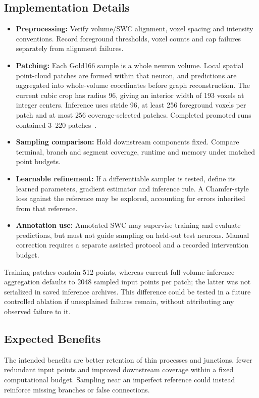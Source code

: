 \documentclass[11pt,a4paper]{article}
\begin{document}
\subsection{Implementation Details}
\begin{itemize}
    \item \textbf{Preprocessing:} Verify volume/SWC alignment, voxel spacing and intensity conventions. Record foreground thresholds, voxel counts and cap failures separately from alignment failures.
    \item \textbf{Patching:} Each Gold166 sample is a whole neuron volume. Local spatial point-cloud patches are formed within that neuron, and predictions are aggregated into whole-volume coordinates before graph reconstruction. The current cubic crop has radius 96, giving an interior width of 193 voxels at integer centers. Inference uses stride 96, at least 256 foreground voxels per patch and at most 256 coverage-selected patches. Completed promoted runs contained 3--220 patches~\cite{report}.
    \item \textbf{Sampling comparison:} Hold downstream components fixed. Compare terminal, branch and segment coverage, runtime and memory under matched point budgets.
    \item \textbf{Learnable refinement:} If a differentiable sampler is tested, define its learned parameters, gradient estimator and inference rule. A Chamfer-style loss against the reference may be explored, accounting for errors inherited from that reference.
    \item \textbf{Annotation use:} Annotated SWC may supervise training and evaluate predictions, but must not guide sampling on held-out test neurons. Manual correction requires a separate assisted protocol and a recorded intervention budget.
\end{itemize}
Training patches contain 512 points, whereas current full-volume inference aggregation defaults to 2048 sampled input points per patch; the latter was not serialized in saved inference archives. This difference could be tested in a future controlled ablation if unexplained failures remain, without attributing any observed failure to it.

\subsection{Expected Benefits}
The intended benefits are better retention of thin processes and junctions, fewer redundant input points and improved downstream coverage within a fixed computational budget. Sampling near an imperfect reference could instead reinforce missing branches or false connections.
\end{document}
